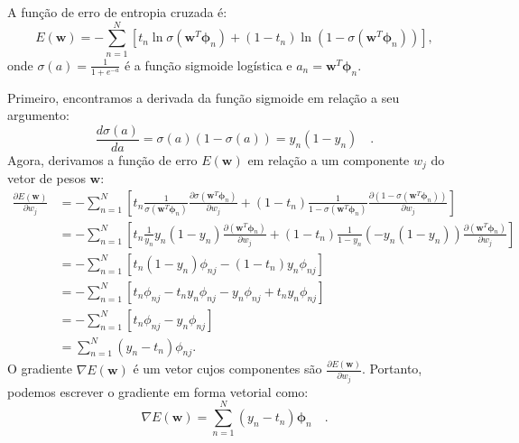 \documentclass{article}
\begin{document}
A função de erro de entropia cruzada é:
\[
E(\mathbf{w}) = -\sum_{n=1}^{N} \left[ t_n \ln \sigma(\mathbf{w}^T \boldsymbol{\phi}_n) + (1 - t_n) \ln(1 - \sigma(\mathbf{w}^T \boldsymbol{\phi}_n)) \right],
\]
onde $\sigma(a) = \frac{1}{1 + e^{-a}}$ é a função sigmoide logística e $a_n = \mathbf{w}^T \boldsymbol{\phi}_n$.

Primeiro, encontramos a derivada da função sigmoide em relação a seu argumento:
\[
\frac{d\sigma(a)}{da} = \sigma(a)(1 - \sigma(a)) = y_n (1 - y_n) \quad.
\]
Agora, derivamos a função de erro $E(\mathbf{w})$ em relação a um componente $w_j$ do vetor de pesos $\mathbf{w}$:
\begin{align*}
\frac{\partial E(\mathbf{w})}{\partial w_j} &= -\sum_{n=1}^{N} \left[ t_n \frac{1}{\sigma(\mathbf{w}^T \boldsymbol{\phi}_n)} \frac{\partial \sigma(\mathbf{w}^T \boldsymbol{\phi}_n)}{\partial w_j} + (1 - t_n) \frac{1}{1 - \sigma(\mathbf{w}^T \boldsymbol{\phi}_n)} \frac{\partial (1 - \sigma(\mathbf{w}^T \boldsymbol{\phi}_n))}{\partial w_j} \right] \\
&= -\sum_{n=1}^{N} \left[ t_n \frac{1}{y_n} y_n (1 - y_n) \frac{\partial (\mathbf{w}^T \boldsymbol{\phi}_n)}{\partial w_j} + (1 - t_n) \frac{1}{1 - y_n} (-y_n (1 - y_n)) \frac{\partial (\mathbf{w}^T \boldsymbol{\phi}_n)}{\partial w_j} \right] \\
&= -\sum_{n=1}^{N} \left[ t_n (1 - y_n) \phi_{nj} - (1 - t_n) y_n \phi_{nj} \right] \\
&= -\sum_{n=1}^{N} \left[ t_n \phi_{nj} - t_n y_n \phi_{nj} - y_n \phi_{nj} + t_n y_n \phi_{nj} \right] \\
&= -\sum_{n=1}^{N} \left[ t_n \phi_{nj} - y_n \phi_{nj} \right] \\
&= \sum_{n=1}^{N} (y_n - t_n) \phi_{nj}.
\end{align*}
O gradiente $\nabla E(\mathbf{w})$ é um vetor cujos componentes são $\frac{\partial E(\mathbf{w})}{\partial w_j}$. Portanto, podemos escrever o gradiente em forma vetorial como:
\[
\nabla E(\mathbf{w}) = \sum_{n=1}^{N} (y_n - t_n) \boldsymbol{\phi}_n \quad.
\]
\end{document}
